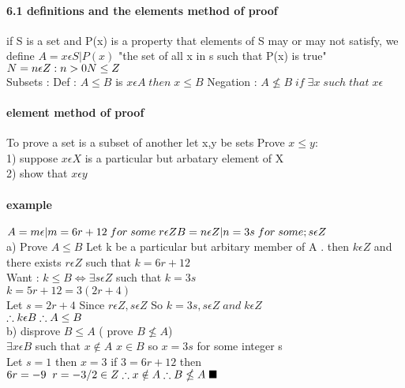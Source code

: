 \documentclass[10pt,letterpaper]{report}
\begin{document}
\paragraph{6.1 definitions and the elements method of proof}{if S is a set and P(x) is a property that elements of S may or may not satisfy, we define $ A={x \epsilon S | P(x)}$ "the set of all x in s such that P(x) is true" $N = { n \epsilon Z : n > 0} \\ N \leq Z $ \\Subsets : Def : $ A \leq B $ is $ x \epsilon A \; then \; x \leq B $ Negation : $ A \nleq B \; if \; \exists x \; such \; that \; x \epsilon $
\paragraph{element method of proof} To prove a set is a subset of another let x,y be sets Prove $ x \leq y :$ \\ 1) suppose $ x \epsilon X $ is a particular but arbatary element of X \\ 2) show that $ x \epsilon y$
\paragraph{example}  $ A = {m \epsilon | m = 6r + 12 \; for \; some \; r \epsilon Z} \\ B = { n \epsilon Z | n = 3s \; for \; some \\; s \epsilon Z}$ \\ a) Prove $ A \leq B $  Let k be a particular but arbitary member of A . then $ k \epsilon Z $ and there exists $ r \epsilon Z $ such that $ k = 6r + 12 $  \\ Want : $ k \leq B \Leftrightarrow \exists s \epsilon Z $ such that $ k = 3s$ \\ $ k = 5r + 12 = 3(2r + 4) $ \\ Let $ s = 2r + 4 $ Since $ r \epsilon Z , s \epsilon Z $ So $ k = 3s, s \epsilon Z \; and \; k \epsilon Z $ \\ $ \therefore k \epsilon B \\ \therefore A \leq B$ \\ b) disprove $ B \leq A $ ( prove $ B \nleq A $) \\ $ \exists x \epsilon B $ such that $ x \notin A $ $ x \in B $ so $ x = 3s $ for some integer s \\ Let $ s = 1 $ then $ x = 3 $ if $ 3 = 6r +12 $ then $ 6r = -9 \; \; r = -3/2 \in Z \\ \therefore x \notin A \\ \therefore B \nleq A \; \blacksquare $
}
\end{document}
